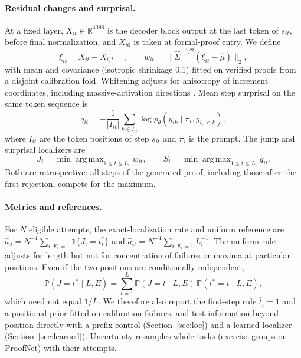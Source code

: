 \documentclass{article}
\newcommand{\PP}{\mathbb{P}}
\newcommand{\1}{\mathbf{1}}
\DeclareMathOperator*{\argmax}{arg\,max}
\begin{document}
\paragraph{Residual changes and surprisal.} At a fixed layer, $X_{it}\in\mathbb{R}^{4096}$ is the decoder block output at the last token of $s_{it}$, before final normalization, and $X_{i0}$ is taken at formal-proof entry. We define
\begin{equation}\label{eq:w}
\xi_{it} = X_{it}-X_{i,t-1},\qquad w_{it} = \bigl\|\hat\Sigma^{-1/2}(\xi_{it}-\hat\mu)\bigr\|_2,
\end{equation}
with mean and covariance (isotropic shrinkage 0.1) fitted on verified proofs from a disjoint calibration fold. Whitening adjusts for anisotropy of increment coordinates, including massive-activation directions \citep{sun2024}. Mean step surprisal on the same token sequence is
\begin{equation}\label{eq:q}
q_{it} = -\frac{1}{|I_{it}|}\sum_{k\in I_{it}}\log p_\theta(y_{ik}\mid \pi_i, y_{i,<k}),
\end{equation}
where $I_{it}$ are the token positions of step $s_{it}$ and $\pi_i$ is the prompt. The jump and surprisal localizers are
\begin{equation}\label{eq:loc}
J_i = \min\argmax_{1\le t\le L_i} w_{it},\qquad S_i=\min\argmax_{1\le t\le L_i} q_{it}.
\end{equation}
Both are retrospective: all steps of the generated proof, including those after the first rejection, compete for the maximum.

\paragraph{Metrics and references.} For $N$ eligible attempts, the exact-localization rate and uniform reference are $\hat a_J = N^{-1}\sum_{i:E_i=1}\1\{J_i=t_i^*\}$ and $\hat a_U = N^{-1}\sum_{i:E_i=1}L_i^{-1}$. The uniform rule adjusts for length but not for concentration of failures or maxima at particular positions. Even if the two positions are conditionally independent,
\begin{equation}\label{eq:pos}
\PP(J=t^*\mid L,E)=\sum_{t=1}^{L}\PP(J=t\mid L,E)\,\PP(t^*=t\mid L,E),
\end{equation}
which need not equal $1/L$. We therefore also report the first-step rule $\hat t_i=1$ and a positional prior fitted on calibration failures, and test information beyond position directly with a prefix control (Section~\ref{sec:loc}) and a learned localizer (Section~\ref{sec:learned}). Uncertainty resamples whole tasks (exercise groups on ProofNet) with their attempts.
\end{document}
